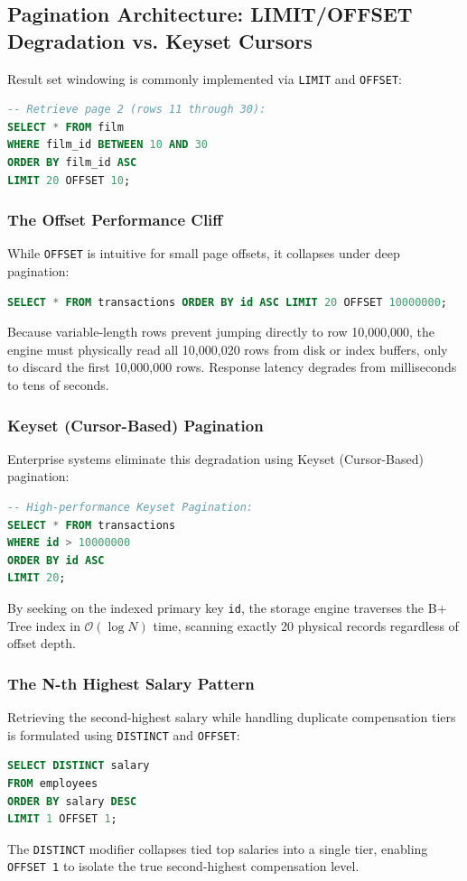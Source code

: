 \documentclass[10pt,twocolumn,letterpaper]{article}
\begin{document}
\subsection{Pagination Architecture: LIMIT/OFFSET Degradation vs. Keyset Cursors}
Result set windowing is commonly implemented via \texttt{LIMIT} and \texttt{OFFSET}:
\begin{lstlisting}[language=SQL]
-- Retrieve page 2 (rows 11 through 30):
SELECT * FROM film 
WHERE film_id BETWEEN 10 AND 30 
ORDER BY film_id ASC 
LIMIT 20 OFFSET 10;
\end{lstlisting}

\subsubsection{The Offset Performance Cliff}
While \texttt{OFFSET} is intuitive for small page offsets, it collapses under deep pagination:
\begin{lstlisting}[language=SQL]
SELECT * FROM transactions ORDER BY id ASC LIMIT 20 OFFSET 10000000;
\end{lstlisting}
Because variable-length rows prevent jumping directly to row 10,000,000, the engine must physically read all 10,000,020 rows from disk or index buffers, only to discard the first 10,000,000 rows. Response latency degrades from milliseconds to tens of seconds.

\subsubsection{Keyset (Cursor-Based) Pagination}
Enterprise systems eliminate this degradation using Keyset (Cursor-Based) pagination:
\begin{lstlisting}[language=SQL]
-- High-performance Keyset Pagination:
SELECT * FROM transactions 
WHERE id > 10000000 
ORDER BY id ASC 
LIMIT 20;
\end{lstlisting}
By seeking on the indexed primary key \texttt{id}, the storage engine traverses the B+ Tree index in $\mathcal{O}(\log N)$ time, scanning exactly 20 physical records regardless of offset depth.

\subsubsection{The N-th Highest Salary Pattern}
Retrieving the second-highest salary while handling duplicate compensation tiers is formulated using \texttt{DISTINCT} and \texttt{OFFSET}:
\begin{lstlisting}[language=SQL]
SELECT DISTINCT salary 
FROM employees 
ORDER BY salary DESC 
LIMIT 1 OFFSET 1;
\end{lstlisting}
The \texttt{DISTINCT} modifier collapses tied top salaries into a single tier, enabling \texttt{OFFSET 1} to isolate the true second-highest compensation level.
\end{document}
